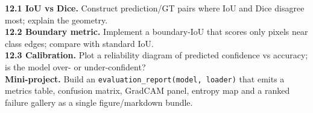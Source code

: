 \begin{exbox}
\textbf{12.1 IoU vs Dice.} Construct prediction/GT pairs where IoU and Dice
disagree most; explain the geometry.\\[2pt]
\textbf{12.2 Boundary metric.} Implement a boundary-IoU that scores only pixels
near class edges; compare with standard IoU.\\[2pt]
\textbf{12.3 Calibration.} Plot a reliability diagram of predicted confidence vs
accuracy; is the model over- or under-confident?\\[2pt]
\textbf{Mini-project.} Build an \texttt{evaluation\_report(model, loader)} that
emits a metrics table, confusion matrix, GradCAM panel, entropy map and a ranked
failure gallery as a single figure/markdown bundle.
\end{exbox}
